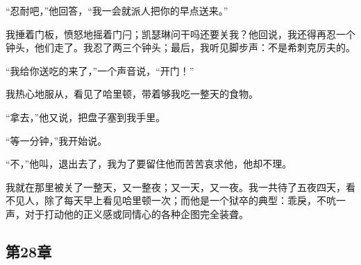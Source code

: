 \par “忍耐吧，”他回答，“我一会就派人把你的早点送来。”
\par 我捶着门板，愤怒地摇着门闩；凯瑟琳问干吗还要关我？他回说，我还得再忍一个钟头，他们走了。我忍了两三个钟头；最后，我听见脚步声：不是希刺克厉夫的。
\par “我给你送吃的来了，”一个声音说，“开门！”
\par 我热心地服从，看见了哈里顿，带着够我吃一整天的食物。
\par “拿去，”他又说，把盘子塞到我手里。
\par “等一分钟，”我开始说。
\par “不，”他叫，退出去了，我为了要留住他而苦苦哀求他，他却不理。
\par 我就在那里被关了一整天，又一整夜；又一天，又一夜。我一共待了五夜四天，看不见人，除了每天早上看见哈里顿一次；而他是一个狱卒的典型：乖戾，不吭一声，对于打动他的正义感或同情心的各种企图完全装聋。


\subsection{第28章}

